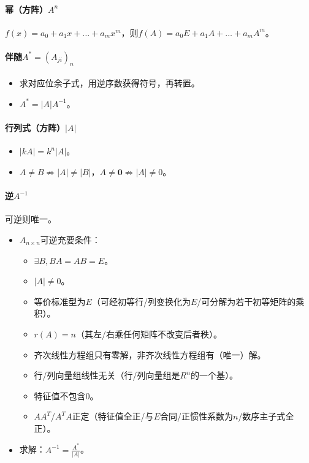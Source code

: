 \documentclass[
12pt, %
a4paper, 
oneside, %
headinclude,footinclude, %
]{scrartcl}
\begin{document}
\paragraph{幂（方阵）$ A^n $}
$ f(x) = a_0 + a_1x + \dots + a_mx^m $，则$ f(A) = a_0E + a_1A + \dots + a_mA^m $。
\paragraph{伴随$ A^* = (A_{ji})_n $}
\begin{itemize}
\item 求对应位余子式，用逆序数获得符号，再转置。
\item $ A^* = |A|A^{-1} $。
\end{itemize}
\paragraph{行列式（方阵）$ |A| $}
\begin{itemize}
\item $ |kA| = k^n|A| $。
\item $ A \neq B \nRightarrow |A| \neq |B| $，$ A \neq \mathbf{0} \nRightarrow |A| \neq 0 $。
\end{itemize}
\paragraph{逆$ A^{-1} $}
可逆则唯一。
\begin{itemize}
\item $ A_{n \times n} $可逆充要条件：
\begin{itemize}
\item $ \exists B, BA = AB = E $。
\item $ |A| \neq 0 $。
\item 等价标准型为$ E $（可经初等行/列变换化为$ E $/可分解为若干初等矩阵的乘积）。
\item $ r(A) = n $（其左/右乘任何矩阵不改变后者秩）。
\item 齐次线性方程组只有零解，非齐次线性方程组有（唯一）解。
\item 行/列向量组线性无关（行/列向量组是$ R^n $的一个基）。
\item 特征值不包含$ 0 $。
\item $ AA^T $/$ A^TA $正定（特征值全正/与$ E $合同/正惯性系数为$ n $/数序主子式全正）。 
\end{itemize}
\item 求解：$ A^{-1} = \frac{A^*}{|A|} $。
\end{itemize}
\end{document}
